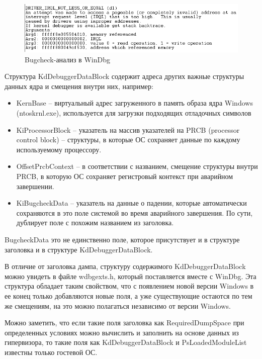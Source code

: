 \documentclass{mipt-thesis-bs}
\begin{document}
\begin{figure}[h]
\begin{center}
    \includegraphics{ss1.png}
    \caption{Bugcheck-анализ в WinDbg}
    \label{fig:windbg-analyze}
\end{center}
\end{figure}

Структура KdDebuggerDataBlock содержит адреса других важные структуры данных ядра и смещения внутри них, например:
\begin{itemize}
\item KernBase -- виртуальный адрес загруженного в память образа ядра Windows (ntoskrnl.exe), используется для загрузки подходящих отладочных символов
\item KiProcessorBlock -- указатель на массив указателей на PRCB (processor control block) -- структуры, в которые ОС сохраняет данные по каждому используемому процессору\cite{winternals1}.
\item OffsetPrcbContext -- в соответствии с названием, смещение структуры внутри PRCB, в которую ОС сохраняет регистровый контекст при аварийном завершении.
\item KiBugcheckData -- указатель на данные о падении, которые автоматически сохраняются в это поле системой во время аварийного завершения. По сути, дублирует поле с похожим названием из заголовка.
\end{itemize}

BugcheckData это не единственно поле, которое присутствует и в структуре заголовка и в структуре KdDebuggerDataBlock.

В отличие от заголовка дампа, структуру содержимого KdDebuggerDataBlock можно увидеть в файле wdbgexts.h, который поставляется вместе с WinDbg. Эта структура обладает таким свойством, что с появлением новой версии Windows в ее конец только добавляются новые поля, а уже существующие остаются по тем же смещениям, на это можно полагаться независимо от версии Windows.

Можно заметить, что если такие поля заголовка как RequiredDumpSpace при определенных условиях можно вычислить и заполнить на основе данных из гипервизора, то такие поля как KdDebuggerDataBlock и PsLoadedModuleList известны только гостевой ОС.
\end{document}
